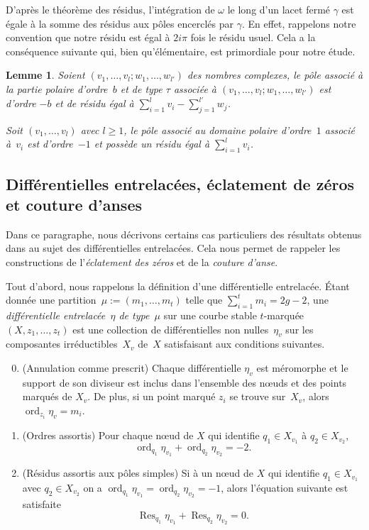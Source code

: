 \documentclass[11pt]{article}
\newcommand{\Subsection}{\subsection}
\numberwithin{equation}{section}\renewcommand{\proofname}{Démonstration}
\DeclareMathOperator{\ord}{ord}
\newcommand\Res{\operatorname{Res}}
\newtheorem{lem}[thm]{Lemme}
\theoremstyle{definition}
\begin{document}
\par
D'après le théorème des résidus, l'intégration de $\omega$ le long d'un lacet fermé $\gamma$ est égale à la somme des résidus aux pôles encerclés par $\gamma$. En effet, rappelons notre convention que notre résidu est égal à $2i\pi$ fois le résidu usuel.
Cela a la conséquence suivante qui, bien qu'élémentaire, est primordiale pour notre étude.
\begin{lem}\label{lm:residu}
Soient $(v_{1},\dots,v_{l};w_{1},\dots,w_{l'})$ des nombres complexes, le pôle associé à la partie polaire d'ordre~$b$ et de type $\tau$ associée à $(v_{1},\dots,v_{l};w_{1},\dots,w_{l'})$ est d'ordre $-b$ et de résidu égal à $\sum_{i=1}^{l} v_{i}-\sum_{j=1}^{l'} w_{j}$.

Soit $(v_{1},\dots,v_{l})$ avec $l\geq1$, le pôle associé au domaine polaire d'ordre~$1$ associé à~$v_{i}$ est d'ordre~$-1$ et possède un résidu égal à $\sum_{i=1}^{l} v_{i}$.
\end{lem}

\Subsection{Différentielles entrelacées, éclatement de zéros et couture d'anses}
\label{sec:pluridiffentre}

Dans ce paragraphe, nous décrivons certains cas particuliers des résultats obtenus dans \cite{BCGGM} au sujet des différentielles entrelacées. Cela nous permet de rappeler les constructions de l'\emph{éclatement des zéros} et de la \emph{couture d'anse}.

Tout d'abord, nous rappelons la définition d'une différentielle entrelacée.
Étant donnée une partition~$\mu:=(m_{1},\dots,m_{t})$ telle que $\sum_{i=1}^t m_i = 2g-2$, une \emph{différentielle entrelacée~$\eta$ de type~$\mu$}
sur une courbe stable $t$-marquée $(X,z_1,\ldots,z_t)$
est une collection de
différentielles non nulles~$\eta_v$ sur les composantes irréductibles~$X_v$ de~$X$ satisfaisant aux conditions suivantes.
\begin{enumerate}\setcounter{enumi}{-1}
\item
(Annulation comme prescrit) Chaque différentielle $\eta_v$ est méromorphe et le support de son diviseur est inclus dans l'ensemble des nœuds et des points marqués de $X_v$. De plus, si un point marqué $z_i$ se trouve sur~$X_v$, alors $\ord_{z_i} \eta_v=m_i$.
\item
(Ordres assortis) Pour chaque nœud de $X$ qui identifie $q_1 \in X_{v_1}$ à $q_2 \in X_{v_2}$,\vspace*{-3pt}
\[
\ord_{q_1} \eta_{v_1}+\ord_{q_2} \eta_{v_2} = -2. \]
\item
(Résidus assortis aux pôles simples) Si à un nœud de $X$
qui identifie $q_1 \in X_{v_1}$ avec $q_2 \in X_{v_2}$ on a $\ord_{q_1}\eta_{v_1}=
\ord_{q_2} \eta_{v_2}=-1$, alors l'équation suivante est satisfaite\vspace*{-3pt}
\[
\Res_{q_1}\eta_{v_1} + \Res_{q_2}\eta_{v_2} = 0 .
\]
\end{enumerate}
\end{document}
